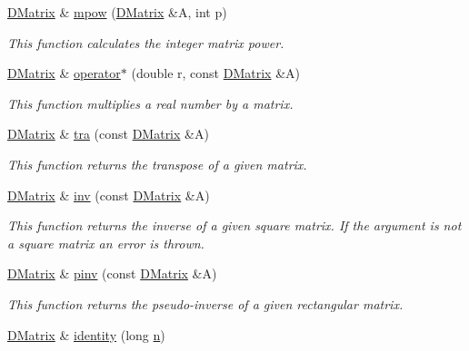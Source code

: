 \begin{DoxyCompactItemize}
\hyperlink{classDMatrix}{DMatrix} \& \hyperlink{classDMatrix_aed1822acbc4a807359a836ab57386d07}{mpow} (\hyperlink{classDMatrix}{DMatrix} \&A, int p)
\begin{DoxyCompactList}\small\item\em This function calculates the integer matrix power. \item\end{DoxyCompactList}\item 
\hyperlink{classDMatrix}{DMatrix} \& \hyperlink{classDMatrix_abf562762c4dfe45f93d14976001bc61e}{operator$\ast$} (double r, const \hyperlink{classDMatrix}{DMatrix} \&A)
\begin{DoxyCompactList}\small\item\em This function multiplies a real number by a matrix. \item\end{DoxyCompactList}\item 
\hyperlink{classDMatrix}{DMatrix} \& \hyperlink{classDMatrix_ada53ba13afcbd8b7e0916c3275839a85}{tra} (const \hyperlink{classDMatrix}{DMatrix} \&A)
\begin{DoxyCompactList}\small\item\em This function returns the transpose of a given matrix. \item\end{DoxyCompactList}\item 
\hyperlink{classDMatrix}{DMatrix} \& \hyperlink{classDMatrix_a322373e24822a8633c2ddfd8f7397c11}{inv} (const \hyperlink{classDMatrix}{DMatrix} \&A)
\begin{DoxyCompactList}\small\item\em This function returns the inverse of a given square matrix. If the argument is not a square matrix an error is thrown. \item\end{DoxyCompactList}\item 
\hyperlink{classDMatrix}{DMatrix} \& \hyperlink{classDMatrix_a07480acdabc192269bf2fceb56eb2ef4}{pinv} (const \hyperlink{classDMatrix}{DMatrix} \&A)
\begin{DoxyCompactList}\small\item\em This function returns the pseudo-\/inverse of a given rectangular matrix. \item\end{DoxyCompactList}\item 
\hyperlink{classDMatrix}{DMatrix} \& \hyperlink{classDMatrix_ac33c390deeaf029a44055773fa06bd00}{identity} (long \hyperlink{classDMatrix_a6b7668991ff7d01230b3599836a5d682}{n})

\end{DoxyCompactItemize}
